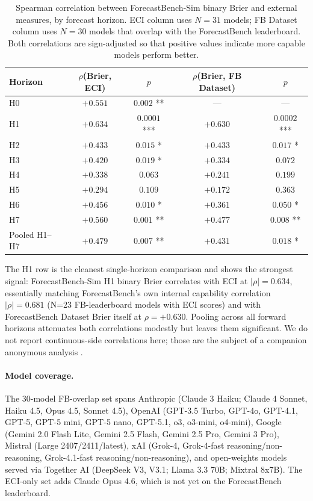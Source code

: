 \documentclass{article}
\begin{document}
\begin{table}[H]
\centering
\caption{Spearman correlation between ForecastBench-Sim binary Brier and external measures, by forecast horizon. ECI column uses $N{=}31$ models; FB Dataset column uses $N{=}30$ models that overlap with the ForecastBench leaderboard. Both correlations are sign-adjusted so that positive values indicate more capable models perform better.}
\label{tab:capability-correlations}
\small
\begin{tabular}{lcccc}
\toprule
Horizon & $\rho$(Brier, ECI) & $p$ & $\rho$(Brier, FB Dataset) & $p$ \\
\midrule
H0 & $+0.551$ & $0.002$ ** & --- & --- \\
H1 & $+0.634$ & $0.0001$ *** & $+0.630$ & $0.0002$ *** \\
H2 & $+0.433$ & $0.015$ * & $+0.433$ & $0.017$ * \\
H3 & $+0.420$ & $0.019$ * & $+0.334$ & $0.072$ \\
H4 & $+0.338$ & $0.063$ & $+0.241$ & $0.199$ \\
H5 & $+0.294$ & $0.109$ & $+0.172$ & $0.363$ \\
H6 & $+0.456$ & $0.010$ * & $+0.361$ & $0.050$ * \\
H7 & $+0.560$ & $0.001$ ** & $+0.477$ & $0.008$ ** \\
\midrule
Pooled H1--H7 & $+0.479$ & $0.007$ ** & $+0.431$ & $0.018$ * \\
\bottomrule
\end{tabular}
\end{table}

The H1 row is the cleanest single-horizon comparison and shows the strongest signal: ForecastBench-Sim H1 binary Brier correlates with ECI at $|\rho|=0.634$, essentially matching ForecastBench's own internal capability correlation $|\rho|=0.681$ (N{=}23 FB-leaderboard models with ECI scores) and with ForecastBench Dataset Brier itself at $\rho=+0.630$. Pooling across all forward horizons attenuates both correlations modestly but leaves them significant. We do not report continuous-side correlations here; those are the subject of a companion anonymous analysis \citep{anonymous2026capability}.

\paragraph{Model coverage.} The 30-model FB-overlap set spans Anthropic (Claude 3 Haiku; Claude 4 Sonnet, Haiku 4.5, Opus 4.5, Sonnet 4.5), OpenAI (GPT-3.5 Turbo, GPT-4o, GPT-4.1, GPT-5, GPT-5 mini, GPT-5 nano, GPT-5.1, o3, o3-mini, o4-mini), Google (Gemini 2.0 Flash Lite, Gemini 2.5 Flash, Gemini 2.5 Pro, Gemini 3 Pro), Mistral (Large 2407/2411/latest), xAI (Grok-4, Grok-4-fast reasoning/non-reasoning, Grok-4.1-fast reasoning/non-reasoning), and open-weights models served via Together AI (DeepSeek V3, V3.1; Llama 3.3 70B; Mixtral 8x7B). The ECI-only set adds Claude Opus 4.6, which is not yet on the ForecastBench leaderboard.
\end{document}
